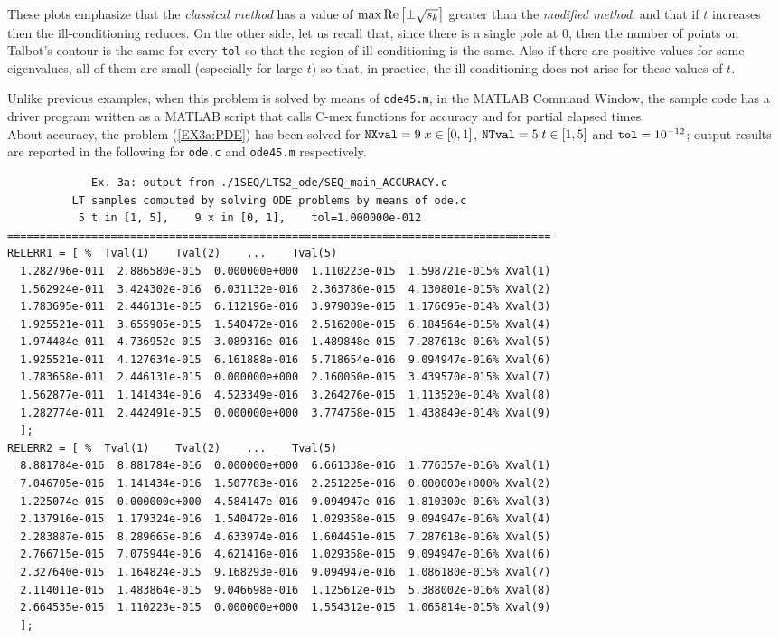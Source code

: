 \documentclass[a4paper,10pt]{report}%
\begin{document}
\noindent These plots emphasize that the {\em classical method} has a value of $\max {\rm Re}\left[\pm\sqrt{s_k}\right]$
greater than the {\em modified method}, and that if $t$ increases then the ill-conditioning reduces.
On the other side, let us recall that, since there is a single pole at $0$, then the number of points on
Talbot's contour is the same for every {\tt tol} so that the region of ill-conditioning is the same.
Also if there are positive values for some eigenvalues, all of them are small (especially for large $t$)
so that, in practice, the ill-conditioning does not arise for these values of $t$.

Unlike previous examples, when this problem is solved by means of {\tt ode45.m}, in the MATLAB Command Window,
the sample code has a driver program written as a MATLAB script that calls C-mex functions for accuracy and for
partial elapsed times.
\\
About accuracy, the problem (\ref{EX3a:PDE}) has been solved for ${\tt NXval}=9\; x\in[0,1]$,
${\tt NTval}=5\; t\in[1,5]$ and ${\tt tol}=10^{-12}$; output results are reported in the following for
{\tt ode.c} and {\tt ode45.m} respectively.
\begin{lstlisting}
             Ex. 3a: output from ./1SEQ/LTS2_ode/SEQ_main_ACCURACY.c
          LT samples computed by solving ODE problems by means of ode.c
           5 t in [1, 5],    9 x in [0, 1],    tol=1.000000e-012
====================================================================================
RELERR1 = [ %  Tval(1)    Tval(2)    ...    Tval(5)
  1.282796e-011  2.886580e-015  0.000000e+000  1.110223e-015  1.598721e-015% Xval(1)
  1.562924e-011  3.424302e-016  6.031132e-016  2.363786e-015  4.130801e-015% Xval(2)
  1.783695e-011  2.446131e-015  6.112196e-016  3.979039e-015  1.176695e-014% Xval(3)
  1.925521e-011  3.655905e-015  1.540472e-016  2.516208e-015  6.184564e-015% Xval(4)
  1.974484e-011  4.736952e-015  3.089316e-016  1.489848e-015  7.287618e-016% Xval(5)
  1.925521e-011  4.127634e-015  6.161888e-016  5.718654e-016  9.094947e-016% Xval(6)
  1.783658e-011  2.446131e-015  0.000000e+000  2.160050e-015  3.439570e-015% Xval(7)
  1.562877e-011  1.141434e-016  4.523349e-016  3.264276e-015  1.113520e-014% Xval(8)
  1.282774e-011  2.442491e-015  0.000000e+000  3.774758e-015  1.438849e-014% Xval(9)
  ];
RELERR2 = [ %  Tval(1)    Tval(2)    ...    Tval(5)
  8.881784e-016  8.881784e-016  0.000000e+000  6.661338e-016  1.776357e-016% Xval(1)
  7.046705e-016  1.141434e-016  1.507783e-016  2.251225e-016  0.000000e+000% Xval(2)
  1.225074e-015  0.000000e+000  4.584147e-016  9.094947e-016  1.810300e-016% Xval(3)
  2.137916e-015  1.179324e-016  1.540472e-016  1.029358e-015  9.094947e-016% Xval(4)
  2.283887e-015  8.289665e-016  4.633974e-016  1.604451e-015  7.287618e-016% Xval(5)
  2.766715e-015  7.075944e-016  4.621416e-016  1.029358e-015  9.094947e-016% Xval(6)
  2.327640e-015  1.164824e-015  9.168293e-016  9.094947e-016  1.086180e-015% Xval(7)
  2.114011e-015  1.483864e-015  9.046698e-016  1.125612e-015  5.388002e-016% Xval(8)
  2.664535e-015  1.110223e-015  0.000000e+000  1.554312e-015  1.065814e-015% Xval(9)
  ];
\end{lstlisting}
\end{document}
